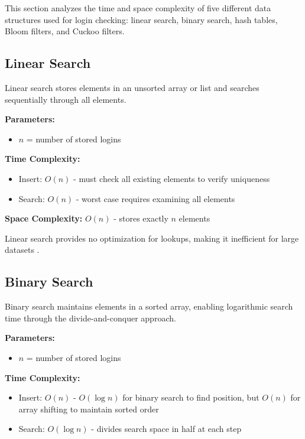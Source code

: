 This section analyzes the time and space complexity of five different data structures used for login checking: linear search, binary search, hash tables, Bloom filters, and Cuckoo filters.

\subsection{Linear Search}

Linear search stores elements in an unsorted array or list and searches sequentially through all elements.

\textbf{Parameters:}
\begin{itemize}
    \item $n$ = number of stored logins
\end{itemize}

\textbf{Time Complexity:}
\begin{itemize}
    \item Insert: $O(n)$ - must check all existing elements to verify uniqueness
    \item Search: $O(n)$ - worst case requires examining all elements
\end{itemize}

\textbf{Space Complexity:} $O(n)$ - stores exactly $n$ elements

Linear search provides no optimization for lookups, making it inefficient for large datasets \cite{cormen2009introduction}.

\subsection{Binary Search}

Binary search maintains elements in a sorted array, enabling logarithmic search time through the divide-and-conquer approach.

\textbf{Parameters:}
\begin{itemize}
    \item $n$ = number of stored logins
\end{itemize}

\textbf{Time Complexity:}
\begin{itemize}
    \item Insert: $O(n)$ - $O(\log n)$ for binary search to find position, but $O(n)$ for array shifting to maintain sorted order
    \item Search: $O(\log n)$ - divides search space in half at each step
\end{itemize}

